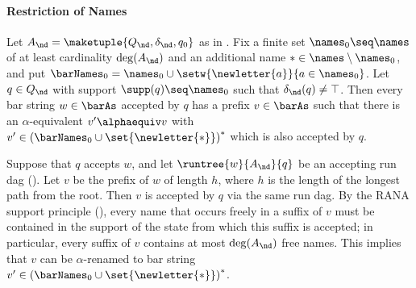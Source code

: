 \documentclass[10pt, final, conference, a4paper, twocolumn]{IEEEtran}
\begin{document}
\paragraph*{Restriction of Names}

\begin{lem}\label{lem:restrNames}
  Let $A_{\nd} = \maketuple{Q_{\nd}, \delta_{\nd}, q_0}$ as in . Fix a finite set $\names_0\seq \names$ of at least cardinality $\deg(A_{\nd})$ and an additional name
  $\ast \in \names\setminus\names_0$, and put  $\barNames_0 =
  \names_0 \cup \setw{\newletter{a}}{a \in \names_0}$. Let $q \in Q_{\nd}$ with support $\supp(q) \seq
  \names_0$ such that $\delta_{\nd}(q)\neq\top$. Then every bar string $w \in \barAs$ accepted
  by $q$ has a prefix $v \in \barAs$
  such that there is an $\alpha$-equivalent $v' \alphaequiv v$ with $v' \in \left(\barNames_0
  \cup \set{\newletter{\ast}}\right)^*$ which is also accepted by $q$.
\end{lem}
\begin{IEEEproof}
Suppose that $q$ accepts $w$, and let $\runtree{w}{A_{\nd}}{q}$ be an accepting run dag (). 
Let $v$ be the prefix of $w$ of length $h$, where $h$ is the length of the longest path from the root. Then $v$ is accepted by $q$ via the same run dag. By the RANA support principle (), every name that occurs freely in a suffix of $v$ must be contained in the support of the state from which this suffix is accepted; in particular, every suffix of $v$ contains at most $\deg(A_{\nd})$ free names. This implies that $v$ can be $\alpha$-renamed to bar string $v'\in \left(\barNames_0
  \cup \set{\newletter{\ast}}\right)^*$.
\end{IEEEproof}
\end{document}
